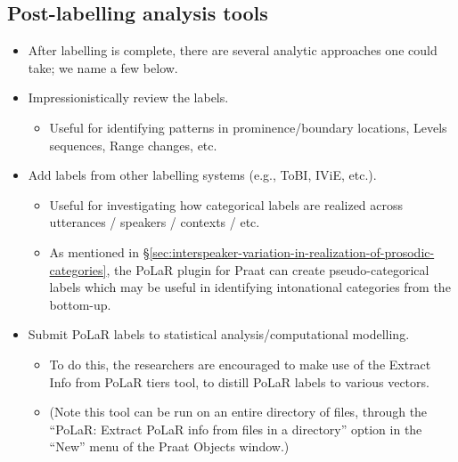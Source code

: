 \documentclass[11pt, twoside]{memoir}
\begin{document}
\subsection{Post-labelling analysis tools}
	\begin{itemize}
		\item After labelling is complete, there are several analytic approaches one could take; we name a few below.
		\item Impressionistically review the labels.
		\begin{itemize}
			\item Useful for identifying patterns in prominence\slash boundary locations, Levels sequences, Range changes, etc.
		\end{itemize}
		\item Add labels from other labelling systems (e.g., ToBI, IViE, etc.).
		\begin{itemize}
			\item Useful for investigating how categorical labels are realized across utterances / speakers / contexts / etc.
			\item As mentioned in §\ref{sec:interspeaker-variation-in-realization-of-prosodic-categories}, the PoLaR plugin for Praat can create pseudo-categorical labels which may be useful in identifying intonational categories from the bottom-up.
		\end{itemize}
		\item Submit PoLaR labels to statistical analysis\slash computational modelling.
		\begin{itemize}
			\item To do this, the researchers are encouraged to make use of the Extract Info from PoLaR tiers tool, to distill PoLaR labels to various vectors.
			\item (Note this tool can be run on an entire directory of files, through the “PoLaR: Extract PoLaR info from files in a directory” option in the “New” menu of the Praat Objects window.)
		\end{itemize}
	\end{itemize}





\end{document}

